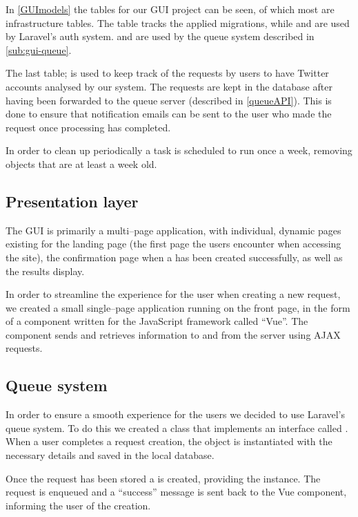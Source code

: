 In \autoref{GUImodels} the tables for our GUI project can be seen, of which
most are infrastructure tables. The table  tracks the applied
migrations, while  and  are used by Laravel's
auth system.  and  are used by the queue system
described in \autoref{sub:gui-queue}.\nl

The last table;  is used to keep track of the requests by
users to have Twitter accounts analysed by our system. The requests are kept in
the database after having been forwarded to the queue server (described in
\autoref{queueAPI}). This is done to ensure that notification emails can be
sent to the user who made the request once processing has completed.\nl

In order to clean up periodically a task is scheduled to run once a week,
removing  objects that are at least a week old.


\subsection{Presentation layer}
The \ac{GUI} is primarily a multi--page application, with individual,
dynamic pages existing for the landing page (the first page the users encounter
when accessing the site), the confirmation page when a  has
been created successfully, as well as the results display.\nl

In order to streamline the experience for the user when creating a new request,
we created a small single--page application running on the front page, in
the form of a component written for the JavaScript framework called ``Vue''. The
component sends and retrieves information to and from the server using
\ac{AJAX} requests.

\subsection{Queue system} \label{sub:gui-queue}
In order to ensure a smooth experience for the users we decided to use Laravel's
queue system. To do this we created a  class that
implements an interface called . When a user completes a
request creation, the  object is instantiated with the
necessary details and saved in the local database.\nl

Once the request has been stored a  is created,
providing the  instance. The request is enqueued and a
``success'' message is sent back to the Vue component, informing the user of the
creation.\nl

